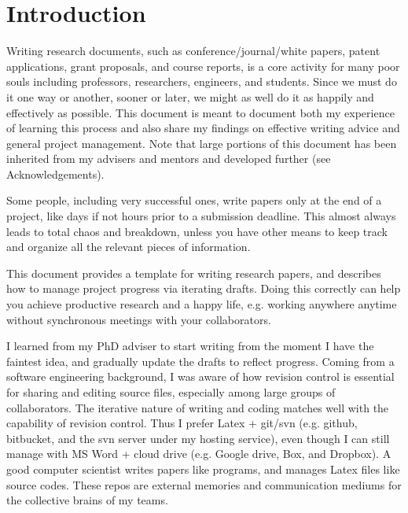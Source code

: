 \section{Introduction \incomplete}
\label{sec:introduction}


Writing research documents, such as conference/journal/white papers, patent applications, grant proposals, and course reports, is a core activity for many poor souls including professors, researchers, engineers, and students.
Since we must do it one way or another, sooner or later, we might as well do it as happily and effectively as possible.
This document is meant to document both my experience of learning this process and also share my findings on effective writing advice and general project management.
Note that large portions of this document has been inherited from my advisers and mentors and developed further (see Acknowledgements).


Some people, including very successful ones, write papers only at the end of a project, like days if not hours prior to a submission deadline.
This almost always leads to total chaos and breakdown, unless you have other means to keep track and organize all the relevant pieces of information.


This document provides a template for writing research papers, and describes how to manage project progress via iterating drafts.
Doing this correctly can help you achieve productive research and a happy life, e.g. working anywhere anytime without synchronous meetings with your collaborators.


I learned from my PhD adviser to start writing from the moment I have the faintest idea, and gradually update the drafts to reflect progress.
Coming from a software engineering background, I was aware of how revision control is essential for sharing and editing source files, especially among large groups of collaborators.
The iterative nature of writing and coding matches well with the capability of revision control.
Thus I prefer Latex + git/svn (e.g. github, bitbucket, and the svn server under my hosting service), even though I can still manage with MS Word + cloud drive (e.g. Google drive, Box, and Dropbox). 
A good computer scientist writes papers like programs, and manages Latex files like source codes.
These repos are external memories and communication mediums for the collective brains of my teams.

